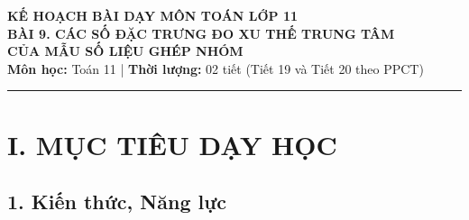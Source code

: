 \documentclass[12pt, a4paper]{article}
\begin{document}
\begin{center}
    {\Large \textbf{KẾ HOẠCH BÀI DẠY MÔN TOÁN LỚP 11}}\\[0.4em]
    {\LARGE \textbf{BÀI 9. CÁC SỐ ĐẶC TRƯNG ĐO XU THẾ TRUNG TÂM}}\\[0.3em]
    {\LARGE \textbf{CỦA MẪU SỐ LIỆU GHÉP NHÓM}}\\[0.5em]
    \textbf{Môn học:} Toán 11 | \textbf{Thời lượng:} 02 tiết (Tiết 19 và Tiết 20 theo PPCT)
\end{center}

\vspace{0.5em}
\hrule
\vspace{1em}

\section*{I. MỤC TIÊU DẠY HỌC}

\subsection*{1. Kiến thức, Năng lực}
\end{document}
